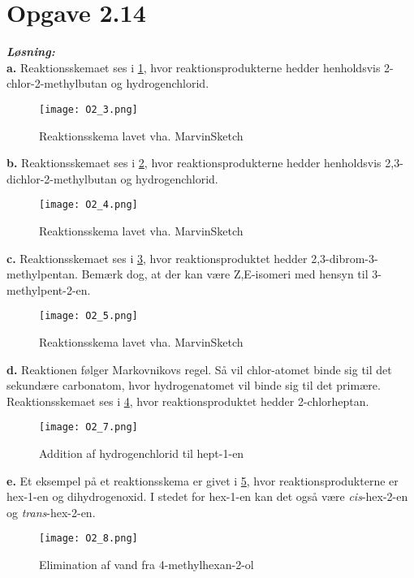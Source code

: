 \documentclass{report}
\newcommand{\sol}{\setlength{\parindent}{0cm}\textbf{\textit{Løsning:}}\setlength{\parindent}{1cm}}
\begin{document}
\section*{Opgave 2.14}
\sol \\ 
\textbf{a.} Reaktionsskemaet ses i \cref{fig:3}, hvor reaktionsprodukterne hedder henholdsvis 2-chlor-2-methylbutan og hydrogenchlorid.
\begin{figure}[H]
\begin{center}
  \texttt{[image: O2\_3.png]}
\end{center}
\caption{Reaktionsskema lavet vha. MarvinSketch}
\label{fig:3}
\end{figure} 
\textbf{b.} Reaktionsskemaet ses i \cref{fig:4}, hvor reaktionsprodukterne hedder henholdsvis 2,3-dichlor-2-methylbutan og hydrogenchlorid.
\begin{figure}[H]
\begin{center}
  \texttt{[image: O2\_4.png]}
\end{center}
\caption{Reaktionsskema lavet vha. MarvinSketch}
\label{fig:4}
\end{figure}
\textbf{c.} Reaktionsskemaet ses i \cref{fig:5}, hvor reaktionsproduktet hedder 2,3-dibrom-3-methylpentan. Bemærk dog, at der kan være Z,E-isomeri med hensyn til 3-methylpent-2-en.
\begin{figure}[H]
\begin{center}
  \texttt{[image: O2\_5.png]}
\end{center}
\caption{Reaktionsskema lavet vha. MarvinSketch}
\label{fig:5}
\end{figure}
\textbf{d.} Reaktionen følger Markovnikovs regel. Så vil chlor-atomet binde sig til det sekundære carbonatom, hvor hydrogenatomet vil binde sig til det primære. Reaktionsskemaet ses i \cref{fig:7}, hvor reaktionsproduktet hedder 2-chlorheptan.
\begin{figure}[H]
\begin{center}
  \texttt{[image: O2\_7.png]}
\end{center}
\caption{Addition af hydrogenchlorid til hept-1-en}
\label{fig:7}
\end{figure} 
\textbf{e.} Et eksempel på et reaktionsskema er givet i \cref{fig:8}, hvor reaktionsprodukterne er hex-1-en og dihydrogenoxid. I stedet for hex-1-en kan det også være \textit{cis}-hex-2-en og \textit{trans}-hex-2-en.
\begin{figure}[H]
\begin{center}
  \texttt{[image: O2\_8.png]}
\end{center}
\caption{Elimination af vand fra 4-methylhexan-2-ol}
\label{fig:8}
\end{figure}
\end{document}
